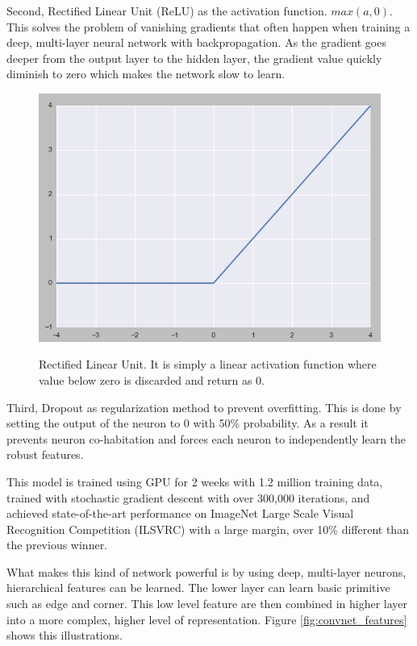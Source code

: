 \documentclass[a4paper,11pt]{kth-mag}
\begin{document}
Second, Rectified Linear Unit (ReLU) as the activation function. $max(a, 0)$. This solves the problem of vanishing gradients that often happen when training a deep, multi-layer neural network with backpropagation. As the gradient goes deeper from the output layer to the hidden layer, the gradient value quickly diminish to zero which makes the network slow to learn.

\begin{figure}[h]
\centering
\includegraphics[scale=0.5]{image/relu.png}
\label{fig:relu}
\caption{Rectified Linear Unit. It is simply a linear activation function where value below zero is discarded and return as 0.}
\end{figure}

Third, Dropout as regularization method to prevent overfitting. This is done by setting the output of the neuron to 0 with 50\% probability. As a result it prevents neuron co-habitation and forces each neuron to independently learn the robust features.

This model is trained using GPU for 2 weeks with 1.2 million training data, trained with stochastic gradient descent with over 300,000 iterations, and achieved state-of-the-art performance on ImageNet Large Scale Visual Recognition Competition (ILSVRC) \cite{alexnet} with a large margin, over 10\% different than the previous winner.

What makes this kind of network powerful is by using deep, multi-layer neurons, hierarchical features can be learned. The lower layer can learn basic primitive such as edge and corner. This low level feature are then combined in higher layer into a more complex, higher level of representation. Figure \ref{fig:convnet_features} shows this illustrations.
\end{document}
